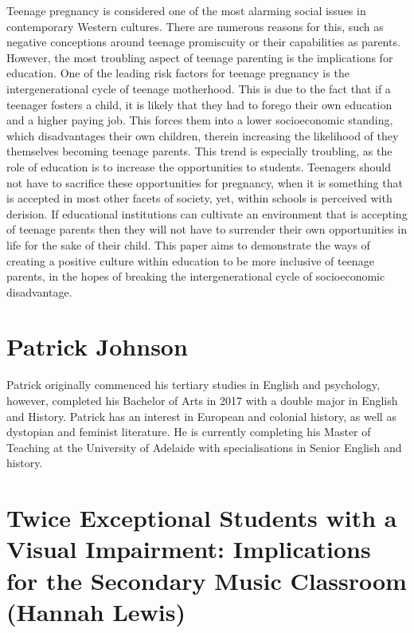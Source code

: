 \documentclass[twoside,12pt,a4paper,notitlepage]{memoir}
\begin{document}
Teenage pregnancy is considered one of the most alarming social issues in contemporary Western cultures. There are numerous reasons for this, such as negative conceptions around teenage promiscuity or their capabilities as parents. However, the most troubling aspect of teenage parenting is the implications for education. One of the leading risk factors for teenage pregnancy is the intergenerational cycle of teenage motherhood. This is due to the fact that if a teenager fosters a child, it is likely that they had to forego their own education and a higher paying job. This forces them into a lower socioeconomic standing, which disadvantages their own children, therein increasing the likelihood of they themselves becoming teenage parents. This trend is especially troubling, as the role of education is to increase the opportunities to students. Teenagers should not have to sacrifice these opportunities for pregnancy, when it is something that is accepted in most other facets of society, yet, within schools is perceived with derision. If educational institutions can cultivate an environment that is accepting of teenage parents then they will not have to surrender their own opportunities in life for the sake of their child. This paper aims to demonstrate the ways of creating a positive culture within education to be more inclusive of teenage parents, in the hopes of breaking the intergenerational cycle of socioeconomic disadvantage. 

\section*{Patrick Johnson}

Patrick originally commenced his tertiary studies in English and psychology, however, completed his Bachelor of Arts in 2017 with a double major in English and History. Patrick has an interest in European and colonial history, as well as dystopian and feminist literature. He is currently completing his Master of Teaching at the University of Adelaide with specialisations in Senior English and history.


\pagebreak
\section*{Twice Exceptional Students with a Visual Impairment: Implications for the Secondary Music Classroom (Hannah Lewis)}
\label{aut:lewis}
\end{document}
